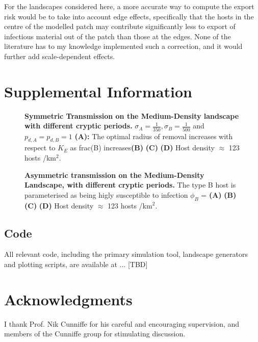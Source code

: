 \documentclass[11pt,letterpaper]{article}
\begin{document}
For the landscapes considered here, a more accurate way to compute the export risk would be to take into account edge effects, specifically that the hosts in the centre of the modelled patch may contribute significantly less to export of infectious material out of the patch than those at the edges. None of the literature has to my knowledge implemented such a correction, and it would further add scale-dependent effects. 


\section*{Supplemental Information}


\begin{figure}[h]
	\centering
	
	\vspace{5mm}
	\caption{ \label{sym3} \textbf{Symmetric Transmission on the Medium-Density landscape with different cryptic periods.} $\sigma_A = \frac{1}{350}, \sigma_B = \frac{1}{500}$ and $p_{d,A} = p_{d,B} = 1$
		\textbf{(A):} The optimal radius of removal increases with respect to $K_E$ as frac(B) increases\textbf{(B)} \textbf{(C)} \textbf{(D)} Host density $\approx$ 123 hosts /km$^2$. }
	\end{figure}



\begin{figure}[h]
	\centering
	
	\vspace{5mm}
	\caption{\label{asym3} \textbf{Asymmetric transmission on the Medium-Density Landscape, with different cryptic periods. } The type B host is parameterised as being higly susceptible to infection $\phi_{B}$ =  \textbf{(A)}  \textbf{(B)} \textbf{(C)} \textbf{(D)} Host density $\approx$ 123 hosts /km$^2$. }
\end{figure}

\subsection*{Code}

All relevant code, including the primary simulation tool, landscape generators and plotting scripts, are available at ... [TBD] 



\section*{Acknowledgments}

I thank Prof. Nik Cunniffe for his careful and encouraging supervision, and members of the Cunniffe group for stimulating discussion. 

%

\printbibliography
 
\end{document}
